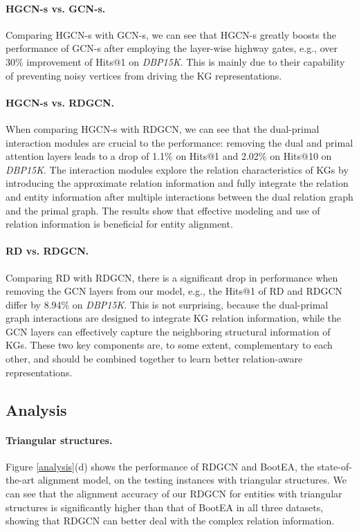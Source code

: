 \documentclass{article}
\begin{document}
\paragraph{HGCN-s vs. GCN-s.}
Comparing HGCN-s with GCN-s, we can see that HGCN-s greatly boosts the performance of GCN-s after employing the layer-wise highway gates, e.g., over 30\% improvement of Hits@1 on
\textit{DBP15K}. This is mainly due to their capability of preventing noisy vertices from driving the KG representations. 

\paragraph{HGCN-s vs. RDGCN.} When comparing HGCN-s with RDGCN, we can see that the dual-primal interaction modules are crucial to the performance: removing the dual and primal attention layers leads to a drop of
1.1\% on Hits@1 and 2.02\% on Hits@10 on \textit{DBP15K}. The interaction modules explore
the relation characteristics of KGs by introducing the approximate relation information and fully integrate the relation and entity information after
multiple interactions between the dual relation graph and the primal graph. The results show that effective modeling and use of relation information is
beneficial for entity alignment.

\paragraph{RD vs. RDGCN.} Comparing RD with RDGCN, there is a significant drop
in performance when removing the GCN layers from our model, e.g., the Hits@1 of RD and RDGCN
differ by 8.94\% on \textit{DBP15K}. This is not surprising, because the dual-primal graph interactions are designed to integrate KG relation information, while the GCN layers can effectively capture the neighboring structural information of KGs. These two key components are, to some extent, complementary to each other, and should be combined together to learn better relation-aware representations. 


\subsection{Analysis\label{sec:prioralignmentdata}} 

\paragraph{Triangular structures.}
Figure \ref{analysis}(d) shows the performance of RDGCN and BootEA, the state-of-the-art alignment model, on the testing instances with triangular structures. 
We can see that the alignment accuracy of our RDGCN for entities with triangular structures is significantly higher than that of BootEA in all three datasets, showing that RDGCN can better deal with the complex relation information. 
\end{document}
